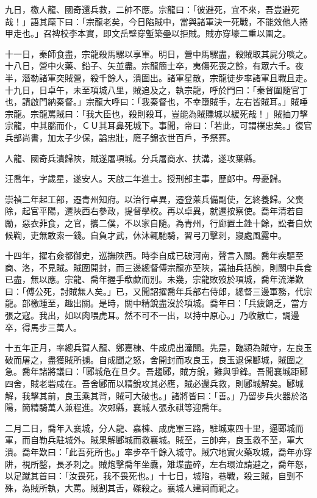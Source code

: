 \begin{pinyinscope}
九日，檄人龍、國奇還兵救，二帥不應。宗龍曰：「彼避死，宜不來，吾豈避死哉！」語其麾下曰：「宗龍老矣，今日陷賊中，當與諸軍決一死戰，不能效他人捲甲走也。」召裨校李本實，即文岳壁穿塹築壘以拒賊。賊亦穿壕二重以圍之。

十一日，秦師食盡，宗龍殺馬騾以享軍。明日，營中馬騾盡，殺賊取其屍分啖之。十八日，營中火藥、鉛子、矢並盡。宗龍簡士卒，夷傷死喪之餘，有眾六千。夜半，潛勒諸軍突賊營，殺千餘人，潰圍出。諸軍星散，宗龍徒步率諸軍且戰且走。十九日，日卓午，未至項城八里，賊追及之，執宗龍，呼於門曰：「秦督圍隨官丁也，請啟門納秦督。」宗龍大呼曰：「我秦督也，不幸墮賊手，左右皆賊耳。」賊唾宗龍。宗龍罵賊曰：「我大臣也，殺則殺耳，豈能為賊賺城以緩死哉！」賊抽刀擊宗龍，中其腦而仆，ＣＵ其耳鼻死城下。事聞，帝曰：「若此，可謂樸忠矣。」復官兵部尚書，加太子少保，謚忠壯，廕子錦衣世百戶，予祭葬。

人龍、國奇兵潰歸陜，賊遂屠項城。分兵屠商水、扶溝，遂攻葉縣。

汪喬年，字歲星，遂安人。天啟二年進士。授刑部主事，歷郎中。母憂歸。

崇禎二年起工部，遷青州知府。以治行卓異，遷登萊兵備副使，乞終養歸。父喪除，起官平陽，遷陜西右參政，提督學校。再以卓異，就遷按察使。喬年清若自勵，惡衣菲食，之官，攜二僕，不以家自隨。為青州，行廊置土銼十餘，訟者自炊候鞫，吏無敢索一錢。自負才武，休沐輒馳騎，習弓刀擊刺，寢處風露中。

十四年，擢右僉都御史，巡撫陜西。時李自成已破河南，聲言入關。喬年疾驅至商、洛，不見賊。賊圍開封，而三邊總督傅宗龍亦至陜，議抽兵括餉，則關中兵食已盡，無以應。宗龍、喬年握手欷歔而別。未幾，宗龍敗歿於項城，喬年流涕歎曰：「傅公死，討賊無人矣。」已，又聞詔擢喬年兵部右侍郎，總督三邊軍務，代宗龍。部檄踵至，趣出關。是時，關中精銳盡沒於項城。喬年曰：「兵疲餉乏，當方張之寇。我出，如以肉喂虎耳。然不可不一出，以持中原心。」乃收散亡，調邊卒，得馬步三萬人。

十五年正月，率總兵賀人龍、鄭嘉棟、牛成虎出潼關。先是，臨潁為賊守，左良玉破而屠之，盡獲賊所擄。自成聞之怒，舍開封而攻良玉，良玉退保郾城，賊圍之急。喬年諸將議曰：「郾城危在旦夕。吾趨郾，賊方銳，難與爭鋒。吾聞襄城距郾四舍，賊老砦咸在。吾舍郾而以精銳攻其必應，賊必還兵救，則郾城解矣。郾城解，我擊其前，良玉乘其背，賊可大破也。」諸將皆曰：「善。」乃留步兵火器於洛陽，簡精騎萬人兼程進。次郟縣，襄城人張永祺等迎喬年。

二月二日，喬年入襄城，分人龍、嘉棟、成虎軍三路，駐城東四十里，逼郾城而軍，而自勒兵駐城外。賊果解郾城而救襄城。賊至，三帥奔，良玉救不至，軍大潰。喬年歎曰：「此吾死所也。」率步卒千餘入城守。賊穴地實火藥攻城，喬年亦穿阱，視所鑿，長矛刺之。賊炮擊喬年坐纛，雉堞盡碎，左右環泣請避之，喬年怒，以足蹴其首曰：「汝畏死，我不畏死也。」十七日，城陷，巷戰，殺三賊，自剄不殊，為賊所執，大罵。賊割其舌，磔殺之。襄城人建祠而祀之。


\end{pinyinscope}
